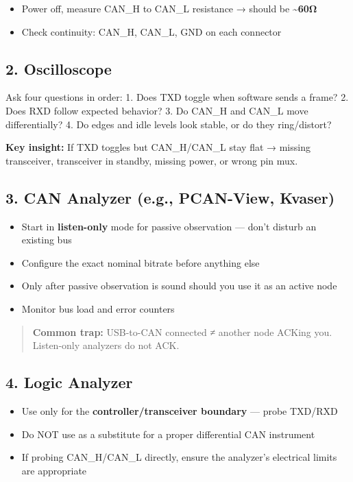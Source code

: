 \documentclass[12pt,a4paper,oneside]{report}
\providecommand{\tightlist}{\setlength{\itemsep}{0pt}\setlength{\parskip}{0pt}}
\begin{document}
\begin{itemize}
\tightlist
\item
  Power off, measure CAN\_H to CAN\_L resistance → should be
  \textbf{\textasciitilde60Ω}
\item
  Check continuity: CAN\_H, CAN\_L, GND on each connector
\end{itemize}

\subsection{2. Oscilloscope}\label{oscilloscope}

Ask four questions in order: 1. Does TXD toggle when software sends a frame? 2.
Does RXD follow expected behavior? 3. Do CAN\_H and CAN\_L move differentially?
4. Do edges and idle levels look stable, or do they ring/distort?

\textbf{Key insight:} If TXD toggles but CAN\_H/CAN\_L stay flat → missing
transceiver, transceiver in standby, missing power, or wrong pin mux.

\subsection{3. CAN Analyzer (e.g., PCAN-View,
Kvaser)}\label{can-analyzer-e.g.-pcan-view-kvaser}

\begin{itemize}
\tightlist
\item
  Start in \textbf{listen-only} mode for passive observation --- don't disturb
  an existing bus
\item
  Configure the exact nominal bitrate before anything else
\item
  Only after passive observation is sound should you use it as an active node
\item
  Monitor bus load and error counters
\end{itemize}

\begin{quote}
\textbf{Common trap:} USB-to-CAN connected ≠ another node ACKing you.
Listen-only analyzers do not ACK.
\end{quote}

\subsection{4. Logic Analyzer}\label{logic-analyzer}

\begin{itemize}
\tightlist
\item
  Use only for the \textbf{controller/transceiver boundary} --- probe TXD/RXD
\item
  Do NOT use as a substitute for a proper differential CAN instrument
\item
  If probing CAN\_H/CAN\_L directly, ensure the analyzer's electrical limits are
  appropriate
\end{itemize}
\end{document}
